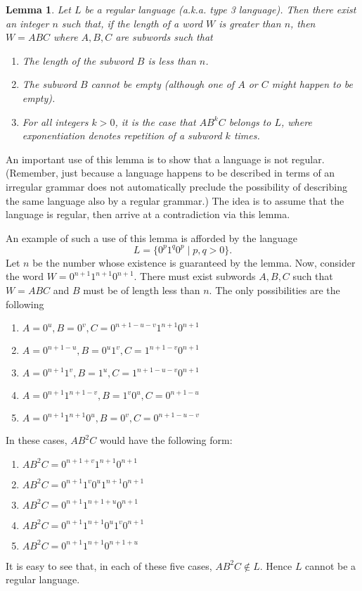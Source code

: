 \documentclass[12pt]{article}
\newtheorem{lemma}{Lemma}
\begin{document}
\begin{lemma}
Let $L$ be a regular language (a.k.a. type 3 language). Then there exist
an integer $n$ such that, if the length of a word $W$ is greater
than $n$, then $W = ABC$ where $A,B,C$ are subwords such that
\begin{enumerate}
\item The length of the subword $B$ is less than $n$.
\item The subword $B$ cannot be empty (although one of $A$ or $C$ might
happen to be empty).
\item For all integers $k > 0$, it is the case that $AB^kC$ belongs to $L$,
where exponentiation denotes repetition of a subword $k$ times.
\end{enumerate}
\end{lemma}

An important use of this lemma is to show that a language
is not regular. (Remember, just because a language happens to be described
in terms of an irregular grammar does not automatically preclude the
possibility of describing the same language also by a
regular grammar.) The idea is to assume that the language is
regular, then arrive at a contradiction via this lemma.

An example of such a use of this lemma is afforded by the language
 \[ L = \{0^p 1^q 0^p \mid p,q > 0 \}.\]
Let $n$ be the number whose existence is guaranteed by the lemma.  
Now, consider the word $W = 0^{n+1} 1^{n+1} 0^{n+1}$.  There must 
exist subwords $A,B,C$ such that $W = ABC$ and $B$ must be of length less than $n$.  The only possibilities are the following
\begin{enumerate}
\item $A = 0^u, B = 0^v, C = 0^{n+1-u-v} 1^{n+1} 0^{n+1}$
\item $A = 0^{n+1-u}, B = 0^u 1^v, C = 1^{n+1-v} 0^{n+1}$
\item $A = 0^{n+1} 1^v, B = 1^u, C = 1^{n+1-u-v} 0^{n+1}$
\item $A = 0^{n+1} 1^{n+1-v}, B = 1^v 0^u, C = 0^{n+1-u}$
\item $A = 0^{n+1} 1^{n+1} 0^u, B = 0^v, C = 0^{n+1-u-v}$
\end{enumerate}
In these cases, $AB^2C$ would have the following form:
\begin{enumerate}
\item $AB^2C = 0^{n+1+v} 1^{n+1} 0^{n+1}$
\item $AB^2C = 0^{n+1} 1^v 0^u 1^{n+1} 0^{n+1}$
\item $AB^2C = 0^{n+1} 1^{n+1+u} 0^{n+1}$
\item $AB^2C = 0^{n+1} 1^{n+1} 0^u 1^v 0^{n+1}$
\item $AB^2C = 0^{n+1} 1^{n+1} 0^{n+1+u}$
\end{enumerate}

It is easy to see that, in each of these five cases, $AB^2C \notin L$.
Hence $L$ cannot be a regular language.


\end{document}
